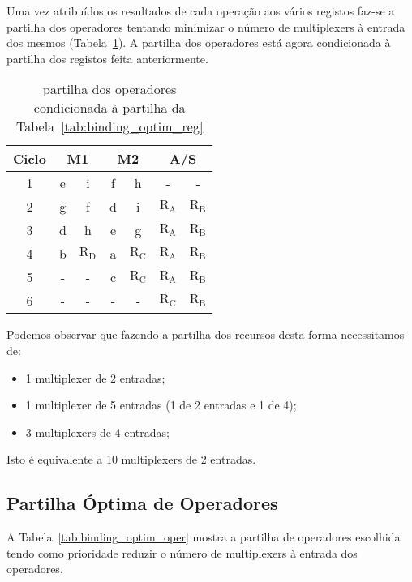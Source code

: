 \documentclass[a4paper]{article}
\begin{document}
Uma vez atribuídos os resultados de cada operação aos vários registos faz-se a partilha dos operadores tentando minimizar o número de multiplexers à entrada dos mesmos (Tabela~\ref{tab:binding_operadores}). A partilha dos operadores está agora condicionada à partilha dos registos feita anteriormente.

\begin{table}[H]
\centering
\begin{tabular}{|c||cc|cc|cc|}
\hline 
Ciclo & \multicolumn{2}{c|}{M1} & \multicolumn{2}{c|}{M2} & \multicolumn{2}{c|}{A/S} \\ 
\hline 
\hline
1 & e & i & f & h & - & - \\ 
\hline 
2 & g & f & d & i & $\mathrm{R_A}$ & $\mathrm{R_B}$ \\ 
\hline 
3 & d & h & e & g & $\mathrm{R_A}$ & $\mathrm{R_B}$ \\ 
\hline 
4 & b & $\mathrm{R_D}$ & a & $\mathrm{R_C}$ & $\mathrm{R_A}$ & $\mathrm{R_B}$ \\ 
\hline 
5 & - & - & c & $\mathrm{R_C}$ & $\mathrm{R_A}$ & $\mathrm{R_B}$ \\ 
\hline 
6 & - & - & - & - & $\mathrm{R_C}$ & $\mathrm{R_B}$ \\ 
\hline 
\end{tabular}
\caption{partilha dos operadores condicionada à partilha da \mbox{Tabela~\ref{tab:binding_optim_reg}}}
\label{tab:binding_operadores}
\end{table}

Podemos observar que fazendo a partilha dos recursos desta forma necessitamos de:
\begin{itemize}
\item 1 multiplexer de 2 entradas;
\item 1 multiplexer de 5 entradas (1 de 2 entradas e 1 de 4);
\item 3 multiplexers de 4 entradas;
\end{itemize}
Isto é equivalente a 10 multiplexers de 2 entradas.

\subsection{Partilha Óptima de Operadores}

A Tabela~\ref{tab:binding_optim_oper} mostra a partilha de operadores escolhida tendo como prioridade reduzir o número de multiplexers à entrada dos operadores.
\end{document}
